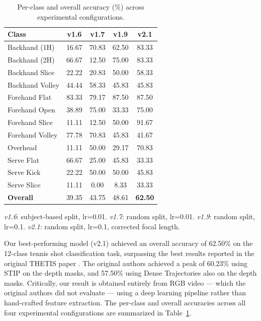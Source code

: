 \documentclass[pdflatex,sn-mathphys-num]{sn-jnl}%
\theoremstyle{thmstyleone}%
\theoremstyle{thmstyletwo}%
\theoremstyle{thmstylethree}%
\begin{document}
\begin{table}[t]
\centering
\caption{Per-class and overall accuracy (\%) across experimental configurations.}
\label{tab:results}
\begin{tabular}{lcccc}
\toprule
\textbf{Class} & \textbf{v1.6} & \textbf{v1.7} & \textbf{v1.9} & \textbf{v2.1} \\
\midrule
Backhand (1H)    & 16.67 & 70.83 & 62.50 & 83.33 \\
Backhand (2H)    & 66.67 & 12.50 & 75.00 & 83.33 \\
Backhand Slice   & 22.22 & 20.83 & 50.00 & 58.33 \\
Backhand Volley  & 44.44 & 58.33 & 45.83 & 45.83 \\
Forehand Flat    & 83.33 & 79.17 & 87.50 & 87.50 \\
Forehand Open    & 38.89 & 75.00 & 33.33 & 75.00 \\
Forehand Slice   & 11.11 & 12.50 & 50.00 & 91.67 \\
Forehand Volley  & 77.78 & 70.83 & 45.83 & 41.67 \\
Overhead         & 11.11 & 50.00 & 29.17 & 70.83 \\
Serve Flat       & 66.67 & 25.00 & 45.83 & 33.33 \\
Serve Kick       & 22.22 & 50.00 & 50.00 & 45.83 \\
Serve Slice      & 11.11 &  0.00 &  8.33 & 33.33 \\
\midrule
\textbf{Overall} & 39.35 & 43.75 & 48.61 & \textbf{62.50} \\
\bottomrule
\end{tabular}
\vspace{2pt}
\begin{flushleft}
\footnotesize
\textit{v1.6}: subject-based split, lr=0.01. 
\textit{v1.7}: random split, lr=0.01. 
\textit{v1.9}: random split, lr=0.1. 
\textit{v2.1}: random split, lr=0.1, corrected focal length.
\end{flushleft}
\end{table}

Our best-performing model (v2.1) achieved an overall accuracy of 62.50\% on the 12-class tennis shot classification task, surpassing the best results reported in the original THETIS paper \cite{thetis}. The original authors achieved a peak of 60.23\% using STIP on the depth masks, and 57.50\% using Dense Trajectories also on the depth masks. Critically, our result is obtained entirely from RGB video --- which the original authors did not evaluate --- using a deep learning pipeline rather than hand-crafted feature extraction. The per-class and overall accuracies across all four experimental configurations are summarized in Table~\ref{tab:results}.
\end{document}

